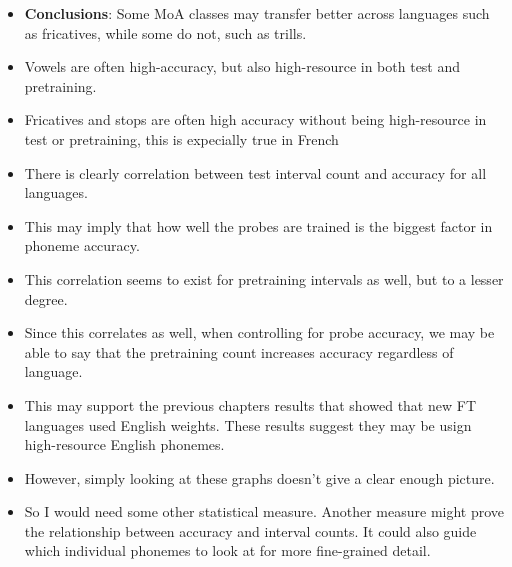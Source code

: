 \newpage
\begin{itemize}
    \item \textbf{Conclusions}: Some MoA classes may transfer better across languages such as fricatives, while some do not, such as trills.
    \item Vowels are often high-accuracy, but also high-resource in both test and pretraining.
    \item Fricatives and stops are often high accuracy without being high-resource in test or pretraining, this is expecially true in French
    \item There is clearly correlation between test interval count and accuracy for all languages.
    \item This may imply that how well the probes are trained is the biggest factor in phoneme accuracy.
    \item This correlation seems to exist for pretraining intervals as well, but to a lesser degree.
    \item Since this correlates as well, when controlling for probe accuracy, we may be able to say that the pretraining count increases accuracy regardless of language.
    \item This may support the previous chapters results that showed that new FT languages used English weights. These results suggest they may be usign high-resource English phonemes.
    \item However, simply looking at these graphs doesn't give a clear enough picture. 
    \item So I would need some other statistical measure. Another measure might prove the relationship between accuracy and interval counts. It could also guide which individual phonemes to look at for more fine-grained detail.

\end{itemize}
